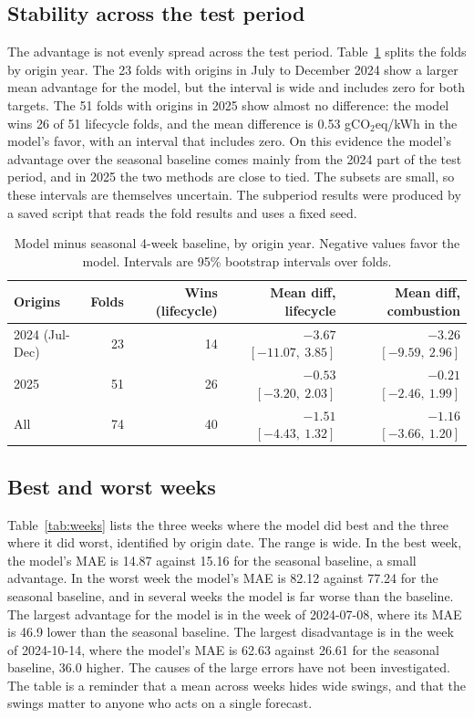 \documentclass[10pt,journal,compsoc]{IEEEtran}
\begin{document}
\subsection{Stability across the test period}
The advantage is not evenly spread across the test period. Table~\ref{tab:subperiod} splits the folds by origin year. The 23 folds with origins in July to December 2024 show a larger mean advantage for the model, but the interval is wide and includes zero for both targets. The 51 folds with origins in 2025 show almost no difference: the model wins 26 of 51 lifecycle folds, and the mean difference is 0.53 gCO$_2$eq/kWh in the model's favor, with an interval that includes zero. On this evidence the model's advantage over the seasonal baseline comes mainly from the 2024 part of the test period, and in 2025 the two methods are close to tied. The subsets are small, so these intervals are themselves uncertain. The subperiod results were produced by a saved script that reads the fold results and uses a fixed seed.

\begin{table}[t]
\caption{Model minus seasonal 4-week baseline, by origin year. Negative values favor the model. Intervals are 95\% bootstrap intervals over folds.}
\label{tab:subperiod}
\centering
\small
\begin{tabular}{@{}lrrrr@{}}
\toprule
Origins & Folds & Wins (lifecycle) & Mean diff, lifecycle & Mean diff, combustion \\
\midrule
2024 (Jul-Dec) & 23 & 14 & $-3.67$ $[-11.07,\ 3.85]$ & $-3.26$ $[-9.59,\ 2.96]$ \\
2025 & 51 & 26 & $-0.53$ $[-3.20,\ 2.03]$ & $-0.21$ $[-2.46,\ 1.99]$ \\
All & 74 & 40 & $-1.51$ $[-4.43,\ 1.32]$ & $-1.16$ $[-3.66,\ 1.20]$ \\
\bottomrule
\end{tabular}
\end{table}

\subsection{Best and worst weeks}
Table~\ref{tab:weeks} lists the three weeks where the model did best and the three where it did worst, identified by origin date. The range is wide. In the best week, the model's MAE is 14.87 against 15.16 for the seasonal baseline, a small advantage. In the worst week the model's MAE is 82.12 against 77.24 for the seasonal baseline, and in several weeks the model is far worse than the baseline. The largest advantage for the model is in the week of 2024-07-08, where its MAE is 46.9 lower than the seasonal baseline. The largest disadvantage is in the week of 2024-10-14, where the model's MAE is 62.63 against 26.61 for the seasonal baseline, 36.0 higher. The causes of the large errors have not been investigated. The table is a reminder that a mean across weeks hides wide swings, and that the swings matter to anyone who acts on a single forecast.
\end{document}
